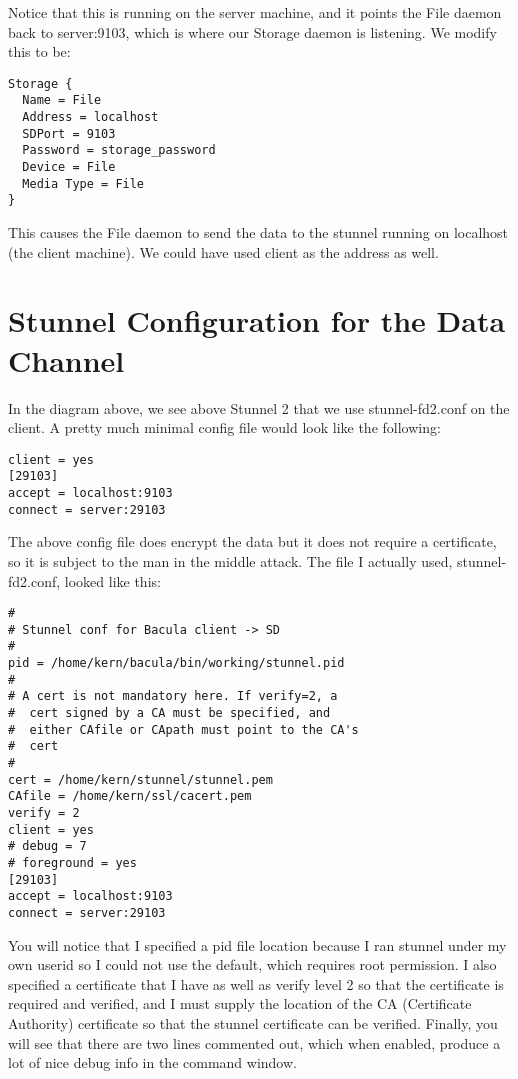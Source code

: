 Notice that this is running on the server machine, and it points the File
daemon back to server:9103, which is where our Storage daemon is listening. We
modify this to be: 

\footnotesize
\begin{verbatim}
Storage {
  Name = File
  Address = localhost
  SDPort = 9103
  Password = storage_password
  Device = File
  Media Type = File
}
\end{verbatim}
\normalsize

This causes the File daemon to send the data to the stunnel running on
localhost (the client machine). We could have used client as the address as
well. 

\section{Stunnel Configuration for the Data Channel}

In the diagram above, we see above Stunnel 2 that we use stunnel-fd2.conf on the
client. A pretty much minimal config file would look like the following: 

\footnotesize
\begin{verbatim}
client = yes
[29103]
accept = localhost:9103
connect = server:29103
\end{verbatim}
\normalsize

The above config file does encrypt the data but it does not require a
certificate, so it is subject to the man in the middle attack. The file I
actually used, stunnel-fd2.conf, looked like this: 

\footnotesize
\begin{verbatim}
#
# Stunnel conf for Bacula client -> SD
#
pid = /home/kern/bacula/bin/working/stunnel.pid
#
# A cert is not mandatory here. If verify=2, a
#  cert signed by a CA must be specified, and
#  either CAfile or CApath must point to the CA's
#  cert
#
cert = /home/kern/stunnel/stunnel.pem
CAfile = /home/kern/ssl/cacert.pem
verify = 2
client = yes
# debug = 7
# foreground = yes
[29103]
accept = localhost:9103
connect = server:29103
\end{verbatim}
\normalsize

You will notice that I specified a pid file location because I ran stunnel
under my own userid so I could not use the default, which requires root
permission. I also specified a certificate that I have as well as verify level
2 so that the certificate is required and verified, and I must supply the
location of the CA (Certificate Authority) certificate so that the stunnel
certificate can be verified. Finally, you will see that there are two lines
commented out, which when enabled, produce a lot of nice debug info in the
command window. 

